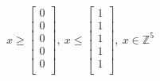 \documentclass[12pt]{article}
\begin{document}
\begin{list}{Exercise .}{}
\begin{list}{()}{}
\(
x \geq \begin{bmatrix} 0\\0\\0\\0\\0\\ \end{bmatrix},\ 
x \leq \begin{bmatrix} 1\\1\\1\\1\\1\\ \end{bmatrix},\ 
x \in \mathbb{Z}^5
\)

\end{list}

\end{list}
\end{document}
